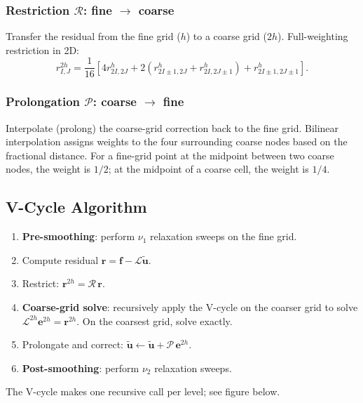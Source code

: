 \subsubsection*{Restriction $\mathcal{R}$: fine $\to$ coarse}
Transfer the residual from the fine grid ($h$) to a coarse grid ($2h$).
Full-weighting restriction in 2D:
\begin{equation}
  r^{2h}_{I,J} = \frac{1}{16}\left[
    4r^h_{2I,2J}
    + 2(r^h_{2I\pm1,2J}+r^h_{2I,2J\pm1})
    + r^h_{2I\pm1,2J\pm1}
  \right].
  \label{eq:lec16:restrict}
\end{equation}

\subsubsection*{Prolongation $\mathcal{P}$: coarse $\to$ fine}
Interpolate (prolong) the coarse-grid correction back to the fine grid.
Bilinear interpolation assigns weights to the four surrounding coarse
nodes based on the fractional distance.  For a fine-grid point at the
midpoint between two coarse nodes, the weight is $1/2$; at the
midpoint of a coarse cell, the weight is $1/4$.

\subsection{V-Cycle Algorithm}\label{subsec:lec16:vcycle}

\begin{enumerate}
  \item \textbf{Pre-smoothing}: perform $\nu_1$ relaxation sweeps on
        the fine grid.
  \item Compute residual $\mathbf{r} = \mathbf{f} - \mathcal{L}\tilde{\mathbf{u}}$.
  \item Restrict: $\mathbf{r}^{2h} = \mathcal{R}\,\mathbf{r}$.
  \item \textbf{Coarse-grid solve}: recursively apply the V-cycle on
        the coarser grid to solve $\mathcal{L}^{2h}\mathbf{e}^{2h}=\mathbf{r}^{2h}$.
        On the coarsest grid, solve exactly.
  \item Prolongate and correct: $\tilde{\mathbf{u}} \leftarrow
        \tilde{\mathbf{u}} + \mathcal{P}\,\mathbf{e}^{2h}$.
  \item \textbf{Post-smoothing}: perform $\nu_2$ relaxation sweeps.
\end{enumerate}

The V-cycle makes one recursive call per level; see figure below.

